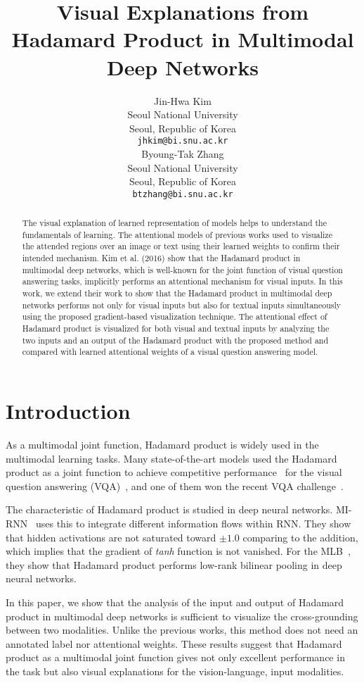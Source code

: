 \documentclass{article}
\title{Visual Explanations from Hadamard Product in Multimodal Deep Networks}
\author{
  Jin-Hwa Kim \\
  Seoul National University\\
  Seoul, Republic of Korea \\
  \texttt{jhkim@bi.snu.ac.kr} \\
  \And
  Byoung-Tak Zhang \\
  Seoul National University\\
  Seoul, Republic of Korea \\
  \texttt{btzhang@bi.snu.ac.kr} \\
}
\begin{document}

\maketitle

\begin{abstract}
The visual explanation of learned representation of models helps to understand the fundamentals of learning.
The attentional models of previous works used to visualize the attended regions over an image or text using their learned weights to confirm their intended mechanism.
Kim et al. (2016) show that the Hadamard product in multimodal deep networks, which is well-known for the joint function of visual question answering tasks, implicitly performs an attentional mechanism for visual inputs.
In this work, we extend their work to show that the Hadamard product in multimodal deep networks performs not only for visual inputs but also for textual inputs simultaneously using the proposed gradient-based visualization technique.
The attentional effect of Hadamard product is visualized for both visual and textual inputs by analyzing the two inputs and an output of the Hadamard product with the proposed method and compared with learned attentional weights of a visual question answering model.
\end{abstract}

\section{Introduction}

As a multimodal joint function, Hadamard product is widely used in the multimodal learning tasks. Many state-of-the-art models used the Hadamard product as a joint function to achieve competitive performance~\cite{Kim2016b,Kim2017,Nam2016,Teney2017} for the visual question answering (VQA)~\cite{agrawal2017vqa}, and one of them won the recent VQA challenge~\cite{Teney2017}. 

The characteristic of Hadamard product is studied in deep neural networks. MI-RNN~\cite{Wu2016a} uses this to integrate different information flows within RNN. They show that hidden activations are not saturated toward $\pm1.0$ comparing to the addition, which implies that the gradient of \textit{tanh} function is not vanished. For the MLB~\cite{Kim2017}, they show that Hadamard product performs low-rank bilinear pooling in deep neural networks.

In this paper, we show that the analysis of the input and output of Hadamard product in multimodal deep networks is sufficient to visualize the cross-grounding between two modalities. Unlike the previous works, this method does not need an annotated label nor attentional weights. These results suggest that Hadamard product as a multimodal joint function gives not only excellent performance in the task but also visual explanations for the vision-language, input modalities.
\end{document}
